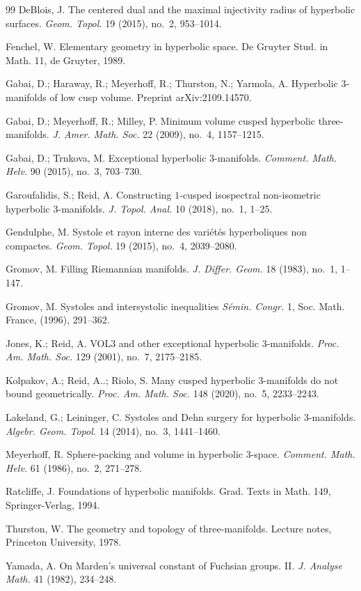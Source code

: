 \documentclass[11pt,reqno]{amsart}
\theoremstyle{definition}
\numberwithin{equation}{section}
\numberwithin{equation}{section}
\begin{document}
\begin{thebibliography}{99}
DeBlois, J.
The centered dual and the maximal injectivity radius of hyperbolic surfaces.
\emph{Geom. Topol.} 19 (2015), no.~2, 953--1014.

Fenchel, W.
Elementary geometry in hyperbolic space.
De Gruyter Stud. in Math. 11, de Gruyter, 1989.

Gabai, D.; Haraway, R.; Meyerhoff, R.; Thurston, N.; Yarmola, A.
Hyperbolic $3$-manifolds of low cusp volume. 
Preprint arXiv:2109.14570.

Gabai, D.; Meyerhoff, R.; Milley, P.
Minimum volume cusped hyperbolic three-manifolds.
\emph{J. Amer. Math. Soc.} 22 (2009), no.~4, 1157--1215.

Gabai, D.; Trnkova, M. 
Exceptional hyperbolic $3$-manifolds.
\emph{Comment. Math. Helv.} 90 (2015), no.~3, 703--730.

Garoufalidis, S.; Reid, A.
Constructing $1$-cusped isospectral non-isometric hyperbolic $3$-manifolds.
\emph{J. Topol. Anal.} 10 (2018), no.~1, 1--25.

Gendulphe, M.
Systole et rayon interne des vari\'et\'es hyperboliques non compactes.
\emph{Geom. Topol.} 19 (2015), no.~4, 2039--2080.

Gromov, M.
Filling Riemannian manifolds.
\emph{J. Differ. Geom.} 18 (1983), no.~1, 1--147.

Gromov, M.
Systoles and intersystolic inequalities
\emph{S\'emin. Congr.} 1, Soc. Math. France, (1996), 291--362.

Jones, K.; Reid, A.
VOL3 and other exceptional hyperbolic $3$-manifolds.
\emph{Proc. Am. Math. Soc.} 129 (2001), no.~7, 2175--2185.

Kolpakov, A.; Reid, A..; Riolo, S.
Many cusped hyperbolic 3-manifolds do not bound geometrically. 
\emph{Proc. Am. Math. Soc.} 148 (2020), no.~5, 2233--2243. 

Lakeland, G.; Leininger, C. 
Systoles and Dehn surgery for hyperbolic $3$-manifolds.
\emph{Algebr. Geom. Topol.} 14 (2014), no.~3, 1441--1460.

Meyerhoff, R.
Sphere-packing and volume in hyperbolic $3$-space.
\emph{Comment. Math. Helv.} 61 (1986), no.~2, 271--278.

Ratcliffe, J.
Foundations of hyperbolic manifolds.
Grad. Texts in Math. 149, Springer-Verlag, 1994.

Thurston, W. 
The geometry and topology of three-manifolds. 
Lecture notes, Princeton University, 1978.

Yamada, A.
On Marden's universal constant of Fuchsian groups. II.
\emph{J. Analyse Math.} 41 (1982), 234--248.



\end{thebibliography}
\end{document}
